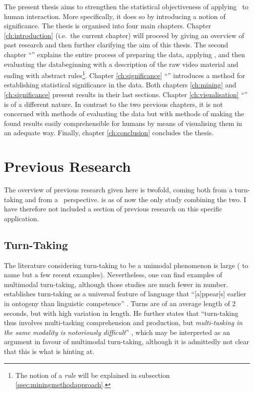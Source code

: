 The present thesis aims to strengthen the statistical objectiveness of applying \fpmlower\ to human interaction. More specifically, it does so by introducing a notion of significance. The thesis is organised into four main chapters.
Chapter \ref{ch:introduction} (i.e.\ the current chapter) will proceed by giving an overview of past research and then further clarifying the aim of this thesis.
The second chapter ``\frequentpatternmining'' explains the entire process of preparing the data, applying \fpmlower, and then evaluating the data\dash beginning with a description of the raw video material and ending with abstract rules\footnote{The notion of a \emph{rule} will be explained in subsection \ref{ssec:miningmethodapproach}.}.
Chapter \ref{ch:significance} ``\significance'' introduces a method for establishing statistical significance in the data. Both chapters \ref{ch:mining} and \ref{ch:significance} present results in their last sections.
Chapter \ref{ch:visualisation} ``\visualisation'' is of a different nature. In contrast to the two previous chapters, it is not concerned with methods of evaluating the data but with methods of making the found results easily comprehensible for humans by means of visualising them in an adequate way.
Finally, chapter \ref{ch:conclusion} concludes the thesis.

\section{Previous Research}
\label{sec:introductionresearch}
The overview of previous research given here is twofold, coming both from a turn-taking and from a \fpmlower\ perspective. \citet{rohlfing18} is as of now the only study combining the two. I have therefore not included a section of previous research on this specific application.


\subsection{Turn-Taking}
\label{sec:introductionresearchturntaking}
The literature considering turn-taking to be a unimodal phenomenon is large (\citep{casillas16,freud16,heldner10} to name but a few recent examples). Nevertheless, one can find examples of multimodal turn-taking, although those studies are much fewer in number.
\citet{levinson16} establishes turn-taking as a universal feature of language that ``[a]ppear[s] earlier in ontogeny than linguistic competence'' \citep[]{levinson16}. Turns are of an average length of 2 seconds, but with high variation in length. He further states that ``turn-taking thus involves multi-tasking comprehension and production, but \emph{multi-tasking in the same modality is notoriously difficult}'' \citep[, emphasis mine]{levinson16}, which may be interpreted as an argument in favour of multimodal turn-taking, although it is admittedly not clear that this is what \citeauthor{levinson16} is hinting at.%

